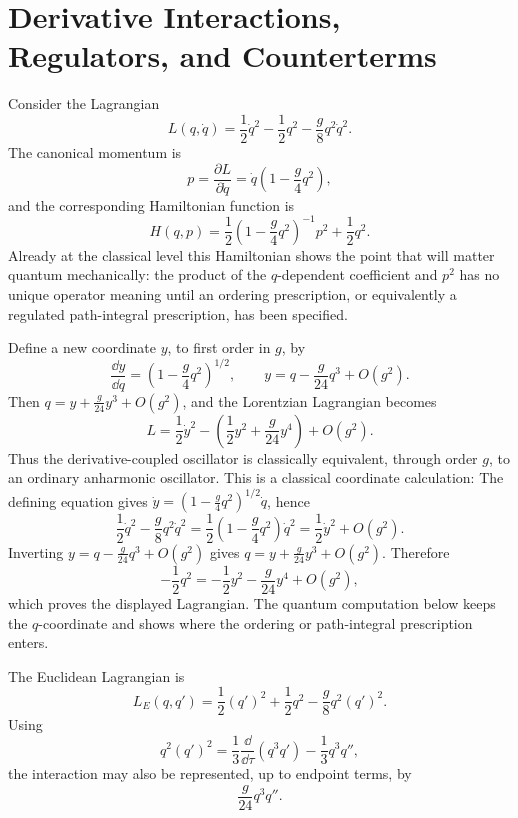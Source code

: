 \section{Derivative Interactions, Regulators, and Counterterms}

Consider the Lagrangian
\[
  L(q,\dot q)
  =
  \frac12\dot q^2-\frac12q^2-\frac{g}{8}q^2\dot q^2 .
\]
The canonical momentum is
\[
  p=\frac{\partial L}{\partial\dot q}
  =
  \dot q\left(1-\frac{g}{4}q^2\right),
\]
and the corresponding Hamiltonian function is
\[
  H(q,p)
  =
  \frac12\left(1-\frac{g}{4}q^2\right)^{-1}p^2
  +\frac12q^2.
\]
Already at the classical level this Hamiltonian shows the point that will
matter quantum mechanically: the product of the \(q\)-dependent coefficient
and \(p^2\) has no unique operator meaning until an ordering prescription, or
equivalently a regulated path-integral prescription, has been specified.

\begin{remark}
\label{prop:derivative-oscillator-classical-field-redefinition}
Define a new coordinate \(y\), to first order in \(g\), by
\[
  \frac{\dd y}{\dd q}
  =
  \left(1-\frac{g}{4}q^2\right)^{1/2},
  \qquad
  y=q-\frac{g}{24}q^3+O(g^2).
\]
Then \(q=y+\frac{g}{24}y^3+O(g^2)\), and the Lorentzian Lagrangian becomes
\[
  L
  =
  \frac12\dot y^2
  -
  \left(
    \frac12y^2+\frac{g}{24}y^4
  \right)
  +O(g^2).
\]
Thus the derivative-coupled oscillator is classically equivalent, through
order \(g\), to an ordinary anharmonic oscillator.  This is a classical
coordinate calculation:
The defining equation gives \(\dot y=(1-\frac{g}{4}q^2)^{1/2}\dot q\), hence
\[
  \frac12\dot q^2-\frac{g}{8}q^2\dot q^2
  =
  \frac12\left(1-\frac{g}{4}q^2\right)\dot q^2
  =
  \frac12\dot y^2+O(g^2).
\]
Inverting \(y=q-\frac{g}{24}q^3+O(g^2)\) gives
\(q=y+\frac{g}{24}y^3+O(g^2)\).  Therefore
\[
  -\frac12q^2
  =
  -\frac12y^2-\frac{g}{24}y^4+O(g^2),
\]
which proves the displayed Lagrangian.  The quantum computation below keeps
the \(q\)-coordinate and shows where the ordering or path-integral
prescription enters.
\end{remark}

The Euclidean Lagrangian is
\[
  L_E(q,q')
  =
  \frac12(q')^2+\frac12q^2-\frac{g}{8}q^2(q')^2 .
\]
Using
\[
  q^2(q')^2
  =
  \frac13\frac{\dd}{\dd\tau}(q^3q')
  -\frac13q^3q'',
\]
the interaction may also be represented, up to endpoint terms, by
\[
  \frac{g}{24}q^3q''.
\]

